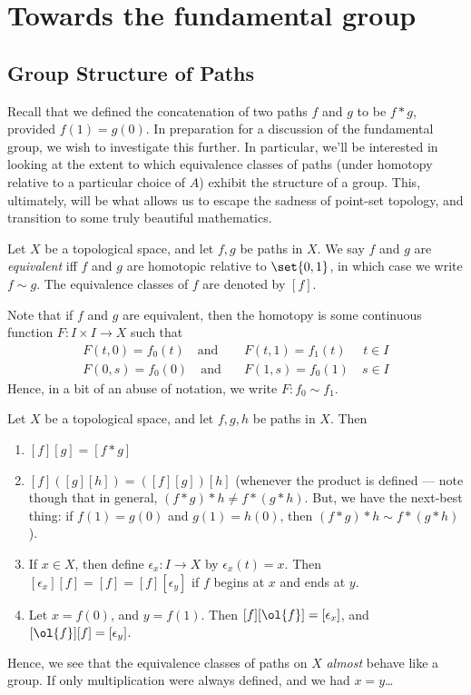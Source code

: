 \documentclass{fkbook}
\theoremstyle{snazzydefinition}
\begin{document}
\section{Towards the fundamental group}
\begin{adjustwidth}{1em}{1em}
  \subsection{Group Structure of Paths}
  Recall that we defined the concatenation of two paths $f$ and $g$ to
  be $f * g$, provided $f(1) = g(0)$. In preparation for a discussion
  of the fundamental group, we wish to investigate this further. In
  particular, we'll be interested in looking at the extent to which
  equivalence classes of paths (under homotopy relative to a
  particular choice of $A$) exhibit the structure of a group. This,
  ultimately, will be what allows us to escape the sadness of
  point-set topology, and transition to some truly beautiful
  mathematics.
  \begin{definition}
    Let $X$ be a topological space, and let $f,g$ be paths in $X$. We
    say $f$ and $g$ are \emph{equivalent} iff $f$ and $g$ are
    homotopic relative to $\set{0,1}$, in which case we write $f \sim
    g$. The equivalence classes of $f$ are denoted by $[f]$.
  \end{definition}
  Note that if $f$ and $g$ are equivalent, then the homotopy is some
  continuous function $F: I \times I \to X$ such that
  \begin{align*}
    F(t,0) = f_0(t) \quad \text{and} &\quad F(t, 1) = f_1(t) \,\,\quad t
    \in I\\
    F(0,s) = f_0(0) \quad \text{and} &\quad F(1, s) = f_0(1) \quad s
    \in I
  \end{align*}
  Hence, in a bit of an abuse of notation, we write $F : f_0 \sim
  f_1$.
  \begin{theorem}
    Let $X$ be a topological space, and let $f,g,h$ be paths in $X$.
    Then
    \begin{enumerate}[label=\arabic*)]
      \item $[f][g] = [f*g]$
      \item $[f]([g][h]) = ([f][g])[h]$ (whenever the product is
        defined --- note though that in general, $(f * g) * h \neq f *
        (g * h)$. But, we have the next-best thing: if $f(1) = g(0)$
        and $g(1) = h(0)$, then $(f * g) * h \sim f * (g * h)$).
      \item If $x \in X$, then define $\epsilon_x : I \to X$ by
        $\epsilon_x(t) = x$. Then $[\epsilon_x][f] = [f] =
        [f][\epsilon_y]$ if $f$ begins at $x$ and ends at $y$.
      \item Let $x = f(0)$, and $y = f(1)$. Then $[f][\ol{f}] =
        [\epsilon_x]$, and $[\ol{f}][f] = [\epsilon_y]$.
    \end{enumerate}
  \end{theorem}
  Hence, we see that the equivalence classes of paths on $X$
  \emph{almost} behave like a group. If only multiplication were
  always defined, and we had $x=y$\ldots

\end{adjustwidth}
\end{document}
